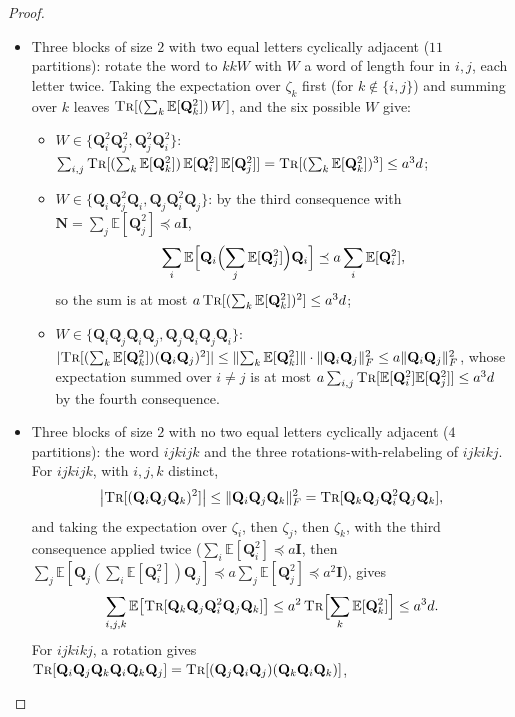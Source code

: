 \documentclass[11pt]{article}
\theoremstyle{remark}
\newcommand{\II}{\mathbf I}
\newcommand{\NN}{\mathbf N}
\newcommand{\QQ}{\mathbf Q}
\newcommand{\uu}{\mathbf u}
\newcommand{\Ex}{\mathbb E}
\newcommand{\norm}[1]{\lVert#1\rVert}
\newcommand{\tr}{\textsc{Tr}}
\begin{document}
\begin{proof}
\begin{itemize}[leftmargin=*,itemsep=1pt]
\begin{align*}
\bigl|\tr[(\QQ_i\QQ_j)^{3}]\bigr|
&=|\zeta_i|^{3}|\zeta_j|^{3}(\uu_i^{\top}\uu_j)^{6}
\le|\zeta_i|^{3}\norm{\uu_i}^{4}\cdot|\zeta_j|^{3}\norm{\uu_j}^{4}\cdot(\uu_i^{\top}\uu_j)^{2},
\end{align*}
with expectations at most $a^{2}\cdot a^{2}\cdot(\uu_i^{\top}\uu_j)^{2}$ for
$i\neq j$, each summing to at most $a^{4}d$.
\item Three blocks of size $2$ with two equal letters cyclically adjacent
($11$ partitions): rotate the word to $kkW$ with $W$ a word of length four
in $i,j$, each letter twice.
Taking the expectation over $\zeta_k$ first (for $k\notin\{i,j\}$) and
summing over $k$ leaves $\tr[(\sum_k\Ex[\QQ_k^{2}])\,W]$, and the six
possible $W$ give:
\begin{itemize}[leftmargin=*,itemsep=1pt]
\item $W\in\{\QQ_i^{2}\QQ_j^{2},\QQ_j^{2}\QQ_i^{2}\}$:
$\sum_{i,j}\tr[(\sum_k\Ex[\QQ_k^{2}])\,\Ex[\QQ_i^{2}]\,\Ex[\QQ_j^{2}]]
=\tr[(\sum_k\Ex[\QQ_k^{2}])^{3}]\le a^{3}d$;
\item $W\in\{\QQ_i\QQ_j^{2}\QQ_i,\QQ_j\QQ_i^{2}\QQ_j\}$: by the third
consequence with $\NN=\sum_j\Ex[\QQ_j^{2}]\preceq a\II$,
\[
\sum_i\Ex\Bigl[\QQ_i\Bigl(\sum_j\Ex[\QQ_j^{2}]\Bigr)\QQ_i\Bigr]\preceq a\sum_i\Ex[\QQ_i^{2}],
\]
so the sum is at most $a\,\tr[(\sum_k\Ex[\QQ_k^{2}])^{2}]\le a^{3}d$;
\item $W\in\{\QQ_i\QQ_j\QQ_i\QQ_j,\QQ_j\QQ_i\QQ_j\QQ_i\}$:
$|\tr[(\sum_k\Ex[\QQ_k^{2}])(\QQ_i\QQ_j)^{2}]|\le\norm{\sum_k\Ex[\QQ_k^{2}]}\cdot\norm{\QQ_i\QQ_j}_F^{2}\le a\norm{\QQ_i\QQ_j}_F^{2}$,
whose expectation summed over $i\neq j$ is at most
$a\sum_{i,j}\tr[\Ex[\QQ_i^{2}]\Ex[\QQ_j^{2}]]\le a^{3}d$ by the fourth
consequence.
\end{itemize}
\item Three blocks of size $2$ with no two equal letters cyclically adjacent
($4$ partitions): the word $ijkijk$ and the three rotations-with-relabeling
of $ijkikj$.
For $ijkijk$, with $i,j,k$ distinct,
\[
\bigl|\tr[(\QQ_i\QQ_j\QQ_k)^{2}]\bigr|
\le\norm{\QQ_i\QQ_j\QQ_k}_F^{2}
=\tr[\QQ_k\QQ_j\QQ_i^{2}\QQ_j\QQ_k],
\]
and taking the expectation over $\zeta_i$, then $\zeta_j$, then $\zeta_k$,
with the third consequence applied twice ($\sum_i\Ex[\QQ_i^{2}]\preceq a\II$,
then $\sum_j\Ex[\QQ_j(\sum_i\Ex[\QQ_i^{2}])\QQ_j]\preceq a\sum_j\Ex[\QQ_j^{2}]\preceq a^{2}\II$),
gives
\[
\sum_{i,j,k}\Ex\bigl[\tr[\QQ_k\QQ_j\QQ_i^{2}\QQ_j\QQ_k]\bigr]
\le a^{2}\,\tr\Bigl[\sum_k\Ex[\QQ_k^{2}]\Bigr]\le a^{3}d .
\]
For $ijkikj$, a rotation gives
$\tr[\QQ_i\QQ_j\QQ_k\QQ_i\QQ_k\QQ_j]=\tr[(\QQ_j\QQ_i\QQ_j)(\QQ_k\QQ_i\QQ_k)]$,

\end{itemize}
\end{proof}
\end{document}
